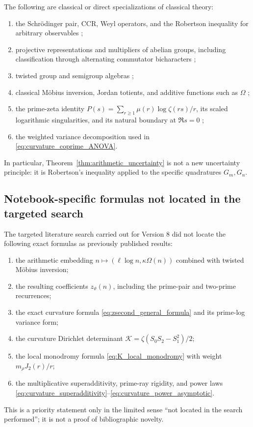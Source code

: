 \documentclass[11pt]{amsart}
\numberwithin{equation}{section}
\theoremstyle{plain}
\theoremstyle{definition}
\theoremstyle{remark}
\begin{document}
The following are classical or direct specializations of classical theory:
\begin{enumerate}[leftmargin=*]
\item the Schr\"odinger pair, CCR, Weyl operators, and the Robertson
inequality for arbitrary observables \cite{Robertson1929,Folland1989};
\item projective representations and multipliers of abelian groups, including
classification through alternating commutator bicharacters
\cite{Kleppner1965,BaggettKleppner1973};
\item twisted group and semigroup algebras
\cite{PackerRaeburn1992,RigalZadunaisky2015};
\item classical M\"obius inversion, Jordan totients, and additive functions
such as \(\Omega\) \cite{Apostol1976};
\item the prime-zeta identity
\(P(s)=\sum_{r\ge1}\mu(r)\log\zeta(rs)/r\), its scaled logarithmic
singularities, and its natural boundary at \(\Re s=0\)
\cite{Froberg1968};
\item the weighted variance decomposition used in
\eqref{eq:curvature_coprime_ANOVA}.
\end{enumerate}
In particular, Theorem~\ref{thm:arithmetic_uncertainty} is not a new
uncertainty principle: it is Robertson's inequality applied to the specific
quadratures \(G_m,G_n\).

\subsection{Notebook-specific formulas not located in the targeted search}
\label{subsec:notebook_specific_formulas}
The targeted literature search carried out for Version 8 did not locate the
following exact formulas as previously published results:
\begin{enumerate}[leftmargin=*]
\item the arithmetic embedding
\(n\mapsto(\ell\log n,\kappa\Omega(n))\) combined with twisted M\"obius
inversion;
\item the resulting coefficients \(z_\vartheta(n)\), including the
prime-pair and two-prime recurrences;
\item the exact curvature formula
\eqref{eq:zsecond_general_formula} and its prime-log variance form;
\item the curvature Dirichlet determinant
\(\mathcal K=\zeta(S_0S_2-S_1^2)/2\);
\item the local monodromy formula
\eqref{eq:K_local_monodromy} with weight \(m_\rho J_2(r)/r\);
\item the multiplicative superadditivity, prime-ray rigidity, and power laws
\eqref{eq:curvature_superadditivity}--\eqref{eq:curvature_power_asymptotic}.
\end{enumerate}
This is a priority statement only in the limited sense ``not located in the
search performed''; it is not a proof of bibliographic novelty.
\end{document}

